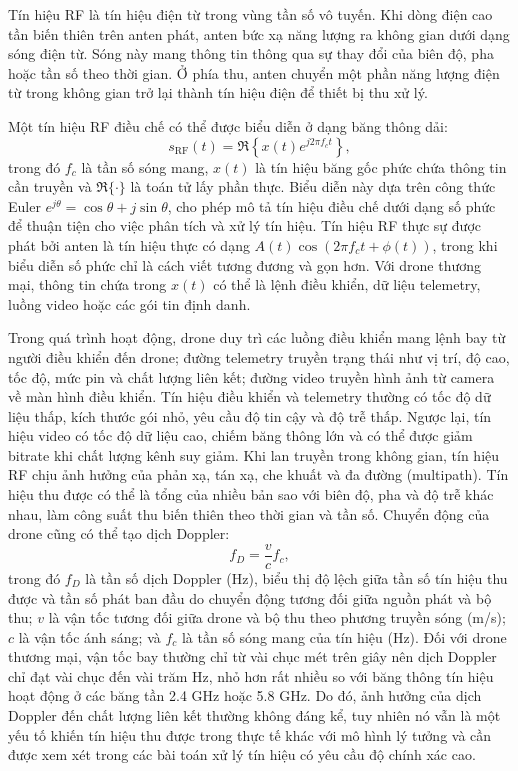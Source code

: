 \documentclass[../DoAn.tex]{subfiles}
\begin{document}
Tín hiệu RF là tín hiệu điện từ trong vùng tần số vô tuyến. Khi dòng điện cao tần biến thiên trên anten phát, anten bức xạ năng lượng ra không gian dưới dạng sóng điện từ. Sóng này mang thông tin thông qua sự thay đổi của biên độ, pha hoặc tần số theo thời gian. Ở phía thu, anten chuyển một phần năng lượng điện từ trong không gian trở lại thành tín hiệu điện để thiết bị thu xử lý.

Một tín hiệu RF điều chế có thể được biểu diễn ở dạng băng thông dải:
\begin{equation}
    s_{\mathrm{RF}}(t)
    =
    \Re\left\{
    x(t)e^{j2\pi f_c t}
    \right\},
\end{equation}
trong đó $f_c$ là tần số sóng mang, $x(t)$ là tín hiệu băng gốc phức chứa thông tin cần truyền và $\Re\{\cdot\}$ là toán tử lấy phần thực. Biểu diễn này dựa trên công thức Euler $e^{j\theta}=\cos\theta+j\sin\theta$, cho phép mô tả tín hiệu điều chế dưới dạng số phức để thuận tiện cho việc phân tích và xử lý tín hiệu. Tín hiệu RF thực sự được phát bởi anten là tín hiệu thực có dạng $A(t)\cos(2\pi f_ct+\phi(t))$, trong khi biểu diễn số phức chỉ là cách viết tương đương và gọn hơn. Với drone thương mại, thông tin chứa trong $x(t)$ có thể là lệnh điều khiển, dữ liệu telemetry, luồng video hoặc các gói tin định danh.

Trong quá trình hoạt động, drone duy trì các luồng điều khiển mang lệnh bay từ người điều khiển đến drone; đường telemetry truyền trạng thái như vị trí, độ cao, tốc độ, mức pin và chất lượng liên kết; đường video truyền hình ảnh từ camera về màn hình điều khiển. Tín hiệu điều khiển và telemetry thường có tốc độ dữ liệu thấp, kích thước gói nhỏ, yêu cầu độ tin cậy và độ trễ thấp. Ngược lại, tín hiệu video có tốc độ dữ liệu cao, chiếm băng thông lớn và có thể được giảm bitrate khi chất lượng kênh suy giảm. Khi lan truyền trong không gian, tín hiệu RF chịu ảnh hưởng của phản xạ, tán xạ, che khuất và đa đường (multipath). Tín hiệu thu được có thể là tổng của nhiều bản sao với biên độ, pha và độ trễ khác nhau, làm công suất thu biến thiên theo thời gian và tần số. Chuyển động của drone cũng có thể tạo dịch Doppler:
\begin{equation}
    f_D = \frac{v}{c} f_c,
\end{equation}
trong đó $f_D$ là tần số dịch Doppler (Hz), biểu thị độ lệch giữa tần số tín hiệu thu được và tần số phát ban đầu do chuyển động tương đối giữa nguồn phát và bộ thu; $v$ là vận tốc tương đối giữa drone và bộ thu theo phương truyền sóng (m/s); $c$ là vận tốc ánh sáng; và $f_c$ là tần số sóng mang của tín hiệu (Hz).  Đối với drone thương mại, vận tốc bay thường chỉ từ vài chục mét trên giây nên dịch Doppler chỉ đạt vài chục đến vài trăm Hz, nhỏ hơn rất nhiều so với băng thông tín hiệu hoạt động ở các băng tần 2.4 GHz hoặc 5.8 GHz. Do đó, ảnh hưởng của dịch Doppler đến chất
lượng liên kết thường không đáng kể, tuy nhiên nó vẫn là một yếu tố khiến tín hiệu
thu được trong thực tế khác với mô hình lý tưởng và cần được xem xét trong các
bài toán xử lý tín hiệu có yêu cầu độ chính xác cao.
\end{document}
